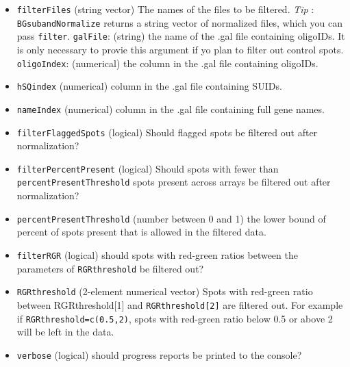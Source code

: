 \documentclass[10pt]{article}
\begin{document}
\begin{itemize}
     	\item \texttt{filterFiles} (string vector) The names of the files to be filtered. \emph{Tip} : \texttt{BGsubandNormalize} returns a string vector of normalized files, which you can pass \texttt{filter}.
     	\texttt{galFile}: (string) the name of the .gal file containing oligoIDs. It is only necessary to provie this argument if yo plan to filter out control spots.
     	\texttt{oligoIndex}: (numerical) the column in the .gal file containing oligoIDs.
     	
     	     	\item \texttt{hSQindex} (numerical) column in the .gal file containing SUIDs. 
     	     	\item \texttt{nameIndex} (numerical) column in the .gal file containing full gene names.

     	      	
       	\item \texttt{filterFlaggedSpots} (logical) Should flagged spots be filtered out after normalization?
       	\item \texttt{filterPercentPresent} (logical) Should spots with fewer than \texttt{percentPresentThreshold} spots present across arrays be filtered out after normalization?
       	\item \texttt{percentPresentThreshold} (number between 0 and 1) the lower bound of percent of spots present that is allowed in the filtered data.
       	\item \texttt{filterRGR} (logical) should spots with red-green ratios between the parameters of \texttt{RGRthreshold} be filtered out?
       	\item \texttt{RGRthreshold} (2-element numerical vector) Spots with red-green ratio between {RGRthreshold[1]} and \texttt{RGRthreshold[2]} are filtered out. For example if \texttt{RGRthreshold=c(0.5,2)}, spots with red-green ratio below 0.5 or above 2 will be left in the data.
  		\item \texttt{verbose} (logical) should progress reports be printed to the console?

\end{itemize}
\end{document}
